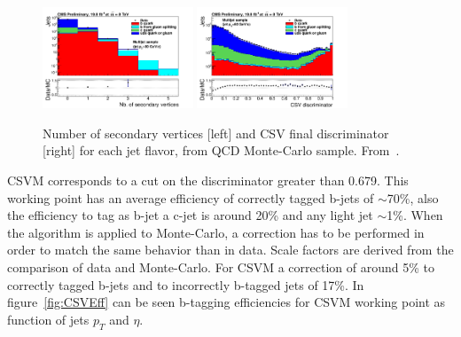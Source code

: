 \begin{figure}[!Hhtbp]
  \begin{center}
    \includegraphics[width=0.4\textwidth]{figs/sv_multi_0_Log.png}
    \includegraphics[width=0.4\textwidth]{figs/pdf-sub.png}
    \caption{Number of secondary vertices [left] and CSV final discriminator [right] for each jet flavor, from QCD Monte-Carlo sample. From~\cite{CMS-PAS-BTV-13-001}.}
    \label{fig:CSVVar}
  \end{center}
\end{figure}

CSVM corresponds to a cut on the discriminator greater than 0.679. This working point has an average efficiency of correctly tagged b-jets of $\sim$70\%, also the efficiency to tag as b-jet a c-jet is around 20\% and any light jet $\sim$1\%. When the algorithm is applied to Monte-Carlo, a correction has to be performed in order to match the same behavior than in data. Scale factors are derived from the comparison of data and Monte-Carlo. For CSVM a correction of around 5\% to correctly tagged b-jets and to incorrectly b-tagged jets of 17\%. In figure~\ref{fig:CSVEff} can be seen b-tagging efficiencies for CSVM working point as function of jets $p_{T}$ and $\eta$.  

